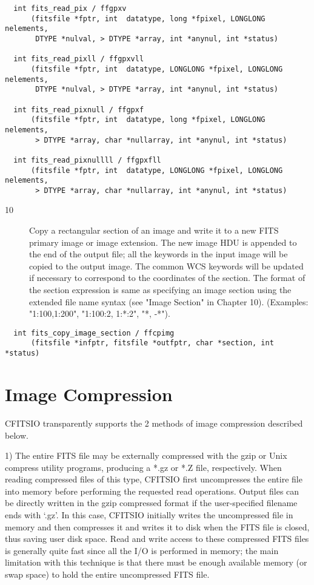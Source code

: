 \documentclass[11pt]{book}
\begin{document}
\begin{verbatim}
  int fits_read_pix / ffgpxv
      (fitsfile *fptr, int  datatype, long *fpixel, LONGLONG nelements,
       DTYPE *nulval, > DTYPE *array, int *anynul, int *status)

  int fits_read_pixll / ffgpxvll
      (fitsfile *fptr, int  datatype, LONGLONG *fpixel, LONGLONG nelements,
       DTYPE *nulval, > DTYPE *array, int *anynul, int *status)

  int fits_read_pixnull / ffgpxf
      (fitsfile *fptr, int  datatype, long *fpixel, LONGLONG nelements,
       > DTYPE *array, char *nullarray, int *anynul, int *status)

  int fits_read_pixnullll / ffgpxfll
      (fitsfile *fptr, int  datatype, LONGLONG *fpixel, LONGLONG nelements,
       > DTYPE *array, char *nullarray, int *anynul, int *status)
\end{verbatim}

\begin{description}
\item[10]  Copy a rectangular section of an image and write it to a new
     FITS primary image or image extension.  The new image HDU is appended
     to the end of the output file; all the keywords in the input image
     will be copied to the output image.  The common WCS keywords will
     be updated if necessary to correspond to the coordinates of the section.
     The format of the section expression is
     same as specifying an image section using the extended file name
     syntax (see "Image Section" in Chapter 10).
     (Examples:  "1:100,1:200", "1:100:2, 1:*:2", "*, -*").
    \label{ffcpimg}
\end{description}

\begin{verbatim}
  int fits_copy_image_section / ffcpimg
      (fitsfile *infptr, fitsfile *outfptr, char *section, int *status)
\end{verbatim}


\section{Image Compression}

CFITSIO transparently supports the 2 methods of image compression described
below.

1)  The entire FITS file may be externally compressed with the gzip or Unix
compress utility programs, producing a *.gz or *.Z file, respectively. When reading
compressed files of this type, CFITSIO first uncompresses the entire file
into memory before performing the requested read operations.  Output files
can be directly written in the gzip compressed format if the user-specified
filename ends with `.gz'.  In this case, CFITSIO initially writes the
uncompressed file in memory and then compresses it and writes it to disk
when the FITS file is closed, thus saving user disk space. Read and write
access to these compressed FITS files is generally quite fast since all the
I/O is performed in memory; the main limitation with this technique is that
there must be enough available memory (or swap space) to hold the entire
uncompressed FITS file.
\end{document}
